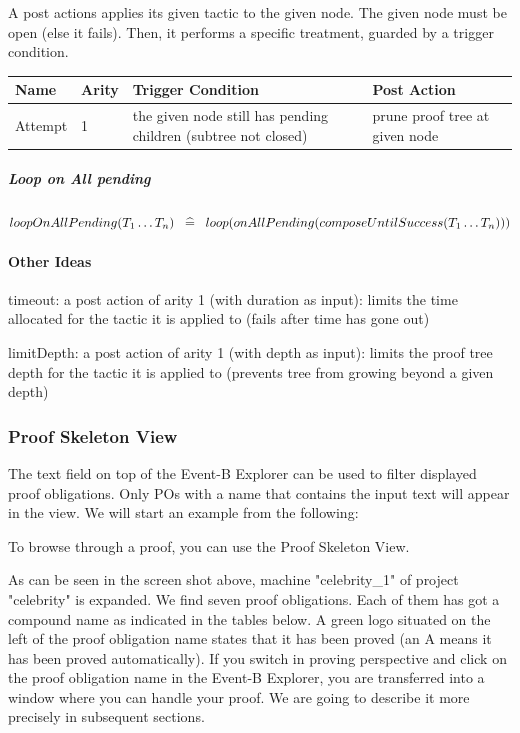 A post actions applies its given tactic to the given node. The given node must be open (else it fails). Then, it performs a specific treatment, guarded by a trigger condition. 

\begin{center}
    \begin{tabular}{ | l | l | l | l | p{5cm} |}
    \hline
	Name & Arity & Trigger Condition & Post Action \\ \hline
	Attempt & 1 & the given node still has pending children (subtree not closed) & prune proof tree at given node  \\ \hline
    \end{tabular}
\end{center}

\subparagraph{Loop on All pending}

$loopOnAllPending(T_1 \ldots T_n) \;\;\mathrel{\widehat=}\;\; loop(onAllPending(composeUntilSuccess(T_1 \ldots T_n)))  $

\paragraph{Other Ideas}

    timeout: a post action of arity 1 (with duration as input): limits the time allocated for the tactic it is applied to (fails after time has gone out)

    limitDepth: a post action of arity 1 (with depth as input): limits the proof tree depth for the tactic it is applied to (prevents tree from growing beyond a given depth) 

\subsubsection{Proof Skeleton View}


The text field on top of the \textsf{Event-B Explorer} can be used to filter displayed proof obligations. Only POs with a name that contains the input text will appear in the view. We will start an example from the following: 

To browse through a proof, you can use the Proof Skeleton View.

As can be seen in the screen shot above, machine "celebrity\_1" of project "celebrity" is expanded. We find seven proof obligations. Each of them has got a compound name as indicated in the tables below. A green logo situated on the left of the proof obligation name states that it has been proved (an A means it has been proved automatically). If you switch in proving perspective and click on the proof obligation name in the Event-B Explorer, you are transferred into a window where you can handle your proof. We are going to describe it more precisely in subsequent sections.



